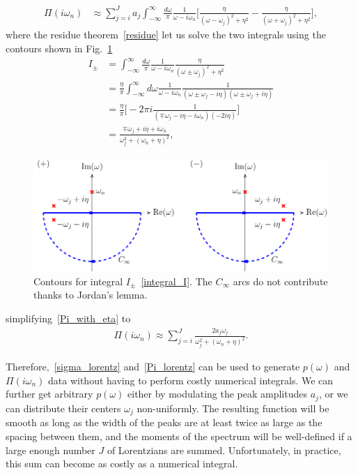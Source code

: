\documentclass[notitlepage,11pt,nofootinbib]{revtex4-1}
\begin{document}
\begin{align}
\Pi(i\omega_n)
&\approx
\sum_{j=i}^{J}
a_j
\int_{-\infty}^{\infty} \frac{d\omega}{\pi}
\frac{1}{\omega-i\omega_n}
\Big[
\frac{\eta}{(\omega-\omega_j)^2+\eta^2}
-
\frac{\eta}{(\omega+\omega_j)^2+\eta^2}
\Big],
\label{Pi_with_eta}
\end{align}
where the residue theorem~\eqref{residue} let us solve the two integrals using the contours shown in Fig.~\ref{contour}
\begin{align}
I_{\pm}
&=
\int_{-\infty}^{\infty} \frac{d\omega}{\pi}
\frac{1}{\omega-i\omega_n}
\frac{\eta}{(\omega\pm\omega_j)^2+\eta^2}
\\
&=
\frac{\eta}{\pi}
\int_{-\infty}^{\infty} d\omega
\frac{1}{\omega-i\omega_n}
\frac{1}{
(\omega\pm\omega_j-i\eta)
(\omega\pm\omega_j+i\eta)
}
\label{integral_I}
\\
&=
\frac{\eta}{\pi}
\bigg[
-2\pi i
\frac{1}{(\mp\omega_j-i\eta-i\omega_n)(-2i\eta)}
\bigg]
\\
&=
\frac{
\mp \omega_j + i\eta + i\omega_n
}{
\omega_j^2+(\omega_n+\eta)^2
},
\end{align}
\begin{figure}
\center
\includegraphics{contour.pdf}
\caption{Contours for integral $I_{\pm}$~\eqref{integral_I}. The $C_{\infty}$ arcs do not contribute thanks to Jordan's lemma.}
\label{contour}
\end{figure}
simplifying~\eqref{Pi_with_eta} to
\begin{align}
\Pi(i\omega_n)
\approx
\sum_{j=i}^{J}
\frac{2a_j\omega_j}{\omega_j^2+(\omega_n+\eta)^2}.
\label{Pi_lorentz}
\end{align}

Therefore,~\eqref{sigma_lorentz} and~\eqref{Pi_lorentz} can be used to generate $p(\omega)$ and $\Pi(i\omega_n)$ data without having to perform costly numerical integrals. We can further get arbitrary $p(\omega)$ either by modulating the peak amplitudes $a_j$, or we can distribute their centers $\omega_j$ non-uniformly. The resulting function will be smooth as long as the width of the peaks are at least twice as large as the spacing between them, and the moments of the spectrum will be well-defined if a large enough number $J$ of Lorentzians are summed. Unfortunately, in practice, this sum can become as costly as a numerical integral.
\end{document}

